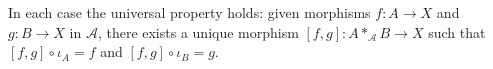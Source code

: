 \begin{proposition}
In each case the universal property holds: given morphisms $f : A \to X$ and $g : B \to X$ in $\mathcal{A}$, there exists a unique morphism $[f, g] : A *_{\mathcal{A}} B \to X$ such that $[f, g] \circ \iota_A = f$ and $[f, g] \circ \iota_B = g$.
\end{proposition}
